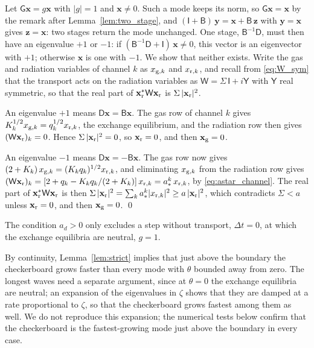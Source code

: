\documentclass[preprint,12pt,authoryear]{elsarticle}
\newcommand{\tenI}{\mathsf{I}}
\newcommand{\tenG}{\mathsf{G}}
\providecommand{\tenD}{\mathsf{D}}
\providecommand{\tenB}{\mathsf{B}}
\providecommand{\tenW}{\mathsf{W}}
\providecommand{\tenY}{\mathsf{Y}}
\begin{document}
\begin{appendix}
\begin{pf}
Let $\tenG\mathbf{x} = g\mathbf{x}$ with $|g| = 1$ and $\mathbf{x} \neq 0$. Such a mode keeps its norm, so $\tenG\mathbf{x} = \mathbf{x}$ by the remark after Lemma~\ref{lem:two_stage}, and $(\tenI + \tenB)\,\mathbf{y} = \mathbf{x} + \tenB\,\mathbf{z}$ with $\mathbf{y} = \mathbf{x}$ gives $\mathbf{z} = \mathbf{x}$: two stages return the mode unchanged. One stage, $\tenB^{-1}\tenD$, must then have an eigenvalue $+1$ or $-1$: if $(\tenB^{-1}\tenD + \tenI)\,\mathbf{x} \neq 0$, this vector is an eigenvector with $+1$; otherwise $\mathbf{x}$ is one with $-1$. We show that neither exists. Write the gas and radiation variables of channel $k$ as $x_{{\rm g},k}$ and $x_{{\rm r},k}$, and recall from \autoref{eq:W_sym} that the transport acts on the radiation variables as $\tenW = \Sigma\,\tenI + i\tenY$ with $\tenY$ real symmetric, so that the real part of $\mathbf{x}_{\rm r}^*\tenW\mathbf{x}_{\rm r}$ is $\Sigma\,|\mathbf{x}_{\rm r}|^2$.

An eigenvalue $+1$ means $\tenD\mathbf{x} = \tenB\mathbf{x}$. The gas row of channel $k$ gives $K_k^{1/2}x_{{\rm g},k} = q_k^{1/2}x_{{\rm r},k}$, the exchange equilibrium, and the radiation row then gives $(\tenW\mathbf{x}_{\rm r})_k = 0$. Hence $\Sigma\,|\mathbf{x}_{\rm r}|^2 = 0$, so $\mathbf{x}_{\rm r} = 0$, and then $\mathbf{x}_{\rm g} = 0$.

An eigenvalue $-1$ means $\tenD\mathbf{x} = -\tenB\mathbf{x}$. The gas row now gives $(2 + K_k)\,x_{{\rm g},k} = (K_kq_k)^{1/2}x_{{\rm r},k}$, and eliminating $x_{{\rm g},k}$ from the radiation row gives $(\tenW\mathbf{x}_{\rm r})_k = [2 + q_k - K_kq_k/(2 + K_k)]\,x_{{\rm r},k} = a_*^k\,x_{{\rm r},k}$, by \autoref{eq:astar_channel}. The real part of $\mathbf{x}_{\rm r}^*\tenW\mathbf{x}_{\rm r}$ is then $\Sigma\,|\mathbf{x}_{\rm r}|^2 = \sum_k a_*^k|x_{{\rm r},k}|^2 \geq a\,|\mathbf{x}_{\rm r}|^2$, which contradicts $\Sigma < a$ unless $\mathbf{x}_{\rm r} = 0$, and then $\mathbf{x}_{\rm g} = 0$. \qed
\end{pf}

The condition $a_d > 0$ only excludes a step without transport, $\Delta t = 0$, at which the exchange equilibria are neutral, $g = 1$.

By continuity, Lemma~\ref{lem:strict} implies that just above the boundary the checkerboard grows faster than every mode with $\theta$ bounded away from zero. The longest waves need a separate argument, since at $\theta = 0$ the exchange equilibria are neutral; an expansion of the eigenvalues in $\zeta$ shows that they are damped at a rate proportional to $\zeta$, so that the checkerboard grows fastest among them as well. We do not reproduce this expansion; the numerical tests below confirm that the checkerboard is the fastest-growing mode just above the boundary in every case.


\end{appendix}
\end{document}

